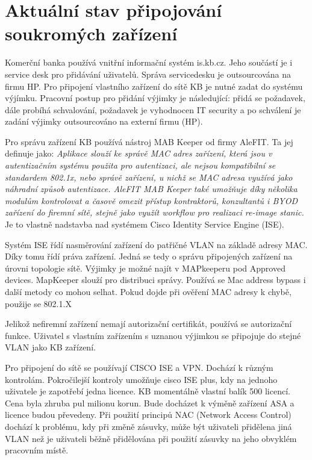 

\section{Aktuální stav připojování soukromých zařízení}

Komerční banka používá vnitřní informační systém is.kb.cz. Jeho součástí je i service desk pro přidávání uživatelů. Správa servicedesku je outsourcována na firmu HP. Pro připojení vlastního zařízení do sítě KB je nutné zadat do systému výjímku. Pracovní postup pro přidání výjimky je následující: přidá se požadavek, dále probíhá schvalování, požadavek je vyhodnocen IT security a po schválení je zadání výjimky outsourcováno na externí firmu (HP). 


Pro správu zařízení KB používá nástroj MAB Keeper od firmy AleFIT. Ta jej definuje jako: \textit{Aplikace slouží ke správě MAC adres zařízení, která jsou v autentizačním systému použita pro autentizaci, ale nejsou kompatibilní se standardem 802.1x, nebo správě zařízení, u nichž se MAC adresa využívá jako náhradní způsob autentizace. AleFIT MAB Keeper také umožňuje díky několika modulům kontrolovat a časově omezit přístup kontraktorů, konzultantů i BYOD zařízení do firemní sítě, stejně jako využít workflow pro realizaci re-image stanic.}  Je to vlastně nadstavba nad systémem Cisco Identity Service Engine (ISE).


Systém ISE řídí nasměrování zařízení do patřičné VLAN na základě adresy MAC. Díky tomu řídí práva zařízení. Jedná se tedy o správu připojených zařízení na úrovni topologie sítě. Výjimky je možné najít v MAPkeeperu pod Approved devices. MapKeeper slouží pro distribuci správy. Používá se Mac address bypass i další metody co mohou selhat. Pokud dojde při ověření MAC adresy k chybě, použije se  802.1.X  


Jelikož nefiremní zařízení nemají autorizační certifikát, používá se autorizační funkce. Uživatel s vlastním zařízením s uznanou výjimkou se připojuje do stejné VLAN jako KB zařízení. 


Pro připojení do sítě se používají CISCO ISE a VPN. Dochází k různým kontrolám. Pokročilejší kontroly umožňuje cisco ISE plus, kdy na jednoho uživatele je zapotřebí jedna licence. KB momentálně vlastní balík 500 licencí. Cena byla zhruba pul milionu korun. Bude docházet k výměně zařízení ASA a licence budou převedeny. Při použití principů NAC (Network Access Control) dochází k problému, kdy při změně zásuvky, může být uživateli přidělena jiná VLAN než je uživateli běžně přidělována při použití zásuvky na jeho obvyklém pracovním místě.


